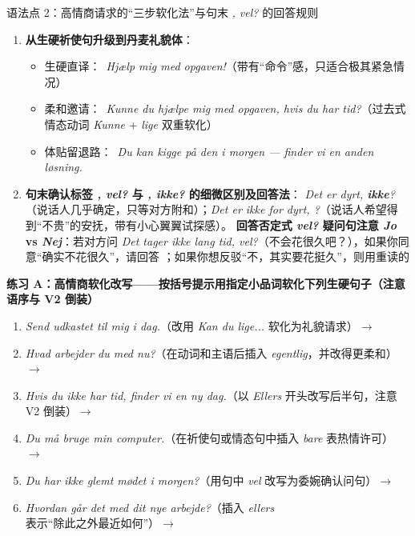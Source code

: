 \begin{grammatikbox}{语法点 2：高情商请求的“三步软化法”与句末 \textit{, vel?} 的回答规则}
\begin{enumerate}
  \item \textbf{从生硬祈使句升级到丹麦礼貌体}：
    \begin{itemize}
      \item 生硬直译：\ \textit{Hjælp mig med opgaven!}（带有“命令”感，只适合极其紧急情况）
      \item 柔和邀请：\ \textit{Kunne du  hjælpe mig med opgaven, hvis du har tid?}（过去式情态动词 \textit{Kunne} + \textit{lige} 双重软化）
      \item 体贴留退路：\ \textit{Du kan  kigge på den i morgen ---  finder vi en anden løsning.}
    \end{itemize}
  \item \textbf{句末确认标签 \textit{, vel?} 与 \textit{, ikke?} 的细微区别及回答法}：
     \textit{Det er dyrt, \textbf{ikke}?}（说话人几乎确定，只等对方附和）；\textit{Det er ikke for dyrt, ?}（说话人希望得到“不贵”的安抚，带有小心翼翼试探感）。\newline
     \textbf{回答否定式 \textit{vel?} 疑问句注意 \textit{Jo} vs \textit{Nej}}：若对方问 \textit{Det tager ikke lang tid, vel?}（不会花很久吧？），如果你同意“确实不花很久”，请回答 ；如果你想反驳“不，其实要花挺久”，则用重读的 
\end{enumerate}
\end{grammatikbox}


\textbf{练习 A：高情商软化改写——按括号提示用指定小品词软化下列生硬句子（注意语序与 V2 倒装）}
\begin{enumerate}
  \item \textit{Send udkastet til mig i dag.}（改用 \textit{Kan du lige...} 软化为礼貌请求）$\rightarrow$
  \item \textit{Hvad arbejder du med nu?}（在动词和主语后插入 \textit{egentlig}，并改得更柔和）$\rightarrow$
  \item \textit{Hvis du ikke har tid, finder vi en ny dag.}（以 \textit{Ellers} 开头改写后半句，注意 V2 倒装）$\rightarrow$
  \item \textit{Du må bruge min computer.}（在祈使句或情态句中插入 \textit{bare} 表热情许可）$\rightarrow$
  \item \textit{Du har ikke glemt mødet i morgen?}（用句中 \textit{vel} 改写为委婉确认问句）$\rightarrow$
  \item \textit{Hvordan går det med dit nye arbejde?}（插入 \textit{ellers} 表示“除此之外最近如何”）$\rightarrow$
\end{enumerate}

